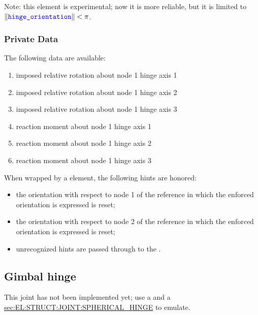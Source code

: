 Note: this element is experimental; now it is more reliable, 
but it is limited to $\left\| \textcolor{blue}{\texttt{hinge\_orientation}} \right\| < \pi$.

\subsubsection{Private Data}
The following data are available:
\begin{enumerate}
\item {} imposed relative rotation about node 1 hinge axis 1
\item {} imposed relative rotation about node 1 hinge axis 2
\item {} imposed relative rotation about node 1 hinge axis 3
\item {} reaction moment about node 1 hinge axis 1
\item {} reaction moment about node 1 hinge axis 2
\item {} reaction moment about node 1 hinge axis 3
\end{enumerate}
When wrapped by a  element, the following hints are honored:
\begin{itemize}
\item {} the orientation with respect to node 1
of the reference in which the enforced orientation is expressed is reset;
\item {} the orientation with respect to node 2
of the reference in which the enforced orientation is expressed is reset;
\item unrecognized hints are passed through to the .
\end{itemize}

\subsection{Gimbal hinge}
This joint has not been implemented yet; use a 
and a
\hyperref{\kw{spherical hinge}}{\kw{spherical hinge} (see Section~}{)}{sec:EL:STRUCT:JOINT:SPHERICAL_HINGE}
to emulate.

